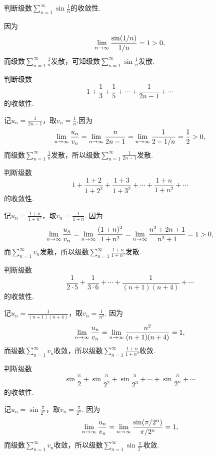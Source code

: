 \begin{example}
判断级数\(\sum\limits_{n=1}^\infty \sin\frac{1}{n}\)的收敛性.
\begin{solution}
因为\[
\lim\limits_{n\to\infty} \frac{\sin(1/n)}{1/n} = 1 > 0,
\]而级数\(\sum\limits_{n=1}^\infty \frac{1}{n}\)发散，可知级数\(\sum\limits_{n=1}^\infty \sin\frac{1}{n}\)发散.
\end{solution}
\end{example}

\begin{example}
判断级数\[
1 + \frac{1}{3} + \frac{1}{5} + \dotsb + \frac{1}{2n-1} + \dotsb
\]的收敛性.
\begin{solution}
记\(u_n = \frac{1}{2n-1}\)，取\(v_n = \frac{1}{n}\).因为\[
\lim\limits_{n\to\infty} \frac{u_n}{v_n} = \lim\limits_{n\to\infty} \frac{n}{2n-1} = \lim\limits_{n\to\infty} \frac{1}{2-1/n} = \frac{1}{2} > 0,
\]而级数\(\sum\limits_{n=1}^\infty \frac{1}{n}\)发散，所以级数\(\sum\limits_{n=1}^\infty \frac{1}{2n-1}\)发散.
\end{solution}
\end{example}

\begin{example}
判断级数\[
1 + \frac{1+2}{1+2^2} + \frac{1+3}{1+3^2} + \dotsb + \frac{1+n}{1+n^2} + \dotsb
\]的收敛性.
\begin{solution}
记\(u_n = \frac{1+n}{1+n^2}\)，取\(v_n = \frac{1}{1+n}\).
因为\[
\lim\limits_{n\to\infty} \frac{u_n}{v_n}
= \lim\limits_{n\to\infty} \frac{(1+n)^2}{1+n^2}
= \lim\limits_{n\to\infty} \frac{n^2 + 2n + 1}{n^2 + 1}
= 1 > 0,
\]而\(\sum\limits_{n=1}^\infty v_n\)发散，所以级数\(\sum\limits_{n=1}^\infty \frac{1+n}{1+n^2}\)发散.
\end{solution}
\end{example}

\begin{example}
判断级数\[
\frac{1}{2\cdot5} + \frac{1}{3\cdot6} + \dotsb + \frac{1}{(n+1)(n+4)} + \dotsb
\]的收敛性.
\begin{solution}
记\(u_n = \frac{1}{(n+1)(n+4)}\)，取\(v_n = \frac{1}{n^2}\).
因为\[
\lim\limits_{n\to\infty} \frac{u_n}{v_n} = \lim\limits_{n\to\infty} \frac{n^2}{(n+1)(n+4)} = 1,
\]而级数\(\sum\limits_{n=1}^\infty v_n\)收敛，所以级数\(\sum\limits_{n=1}^\infty \frac{1+n}{1+n^2}\)收敛.
\end{solution}
\end{example}

\begin{example}
\newcommand\sinfrac[1][]{\sin\frac{\pi}{2^{#1}}}
判断级数\[
\sinfrac + \sinfrac[2] + \sinfrac[3] + \dotsb + \sinfrac[n] + \dotsb
\]的收敛性.
\begin{solution}
记\(u_n = \sin\frac{\pi}{2^n}\)，取\(v_n = \frac{\pi}{2^n}\).
因为\[
\lim\limits_{n\to\infty} \frac{u_n}{v_n}
= \lim\limits_{n\to\infty} \frac{\sin(\pi/2^n)}{\pi/2^n} = 1,
\]而级数\(\sum\limits_{n=1}^\infty v_n\)收敛，所以级数\(\sum\limits_{n=1}^\infty \sin\frac{\pi}{2^n}\)收敛.
\end{solution}
\end{example}

